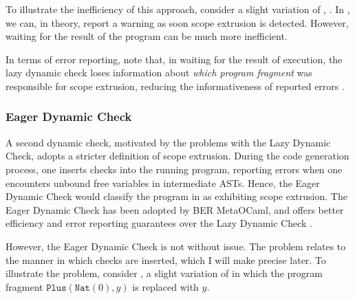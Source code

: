 To illustrate the inefficiency of this approach, consider a slight variation of , . In , we can, in theory, report a warning as soon scope extrusion is detected. However, waiting for the result of the program can be much more inefficient. 

In terms of error reporting, note that, in waiting for the result of execution, the lazy dynamic check loses information about \textit{which program fragment} was responsible for scope extrusion, reducing the informativeness of reported errors \citep{kiselyov-14}.  

\subsubsection{Eager Dynamic Check}\label{subsubsection:eager-dynamic-check}
A second dynamic check, motivated by the problems with the Lazy Dynamic Check, adopts a stricter definition of scope extrusion. During the code generation process, one inserts checks into the running program, reporting errors when one encounters  unbound free variables in intermediate ASTs. Hence, the Eager Dynamic Check would classify the program in  as exhibiting scope extrusion. The Eager Dynamic Check has been adopted by BER MetaOCaml, and offers better efficiency and error reporting guarantees over the Lazy Dynamic Check \citep{kiselyov-14}.

However, the Eager Dynamic Check is not without issue. The problem relates to the 
manner in which checks are inserted, which I will make precise later. To illustrate the problem, consider , a slight variation of  in which the program fragment $\texttt{Plus}({\texttt{Nat}({0})}, y)$ is replaced with $y$. 

